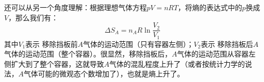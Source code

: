 还可以从另一个角度理解：根据理想气体方程$pV=nRT$，将熵的表达式中的$p$换成$V$，那么我们有：
$$
\Delta S_A = n_A R \ln \frac{V_2}{V_1}
$$
其中$V_1$表示 移除挡板前$A$气体的运动范围（只有容器左侧）；$V_2$表示 移除挡板后$A$气体的运动范围（整个容器）。很显然，移除挡板后，$A$气体的运动范围从容器左侧扩大到了整个容器，这就导致$A$气体的混乱程度上升了（或者按统计力学的说法，$A$气体可能的微观态个数增加了），也就是熵上升了。

